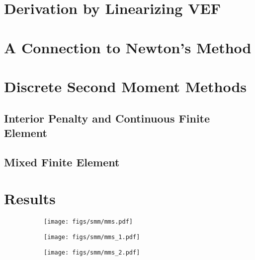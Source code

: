 \documentclass[../doc.tex]{subfiles}
\begin{document}
\section{Derivation by Linearizing VEF}

\section{A Connection to Newton's Method}

\section{Discrete Second Moment Methods}
\subsection{Interior Penalty and Continuous Finite Element}

\subsection{Mixed Finite Element}

\section{Results}

\begin{figure}
\centering
\begin{subfigure}{.4\textwidth}
	\centering
	\texttt{[image: figs/smm/mms.pdf]}
	\caption{}
\end{subfigure}
\begin{subfigure}{.4\textwidth}
	\centering
	\texttt{[image: figs/smm/mms\_1.pdf]}
	\caption{}
\end{subfigure}
\begin{subfigure}{.4\textwidth}
	\centering
	\texttt{[image: figs/smm/mms\_2.pdf]}
	\caption{}
\end{subfigure}
\end{figure}

\begin{table}
\centering
\caption{}
\label{}

\end{table}

\begin{table}
\centering
\caption{}
\label{}

\end{table}
\end{document}
